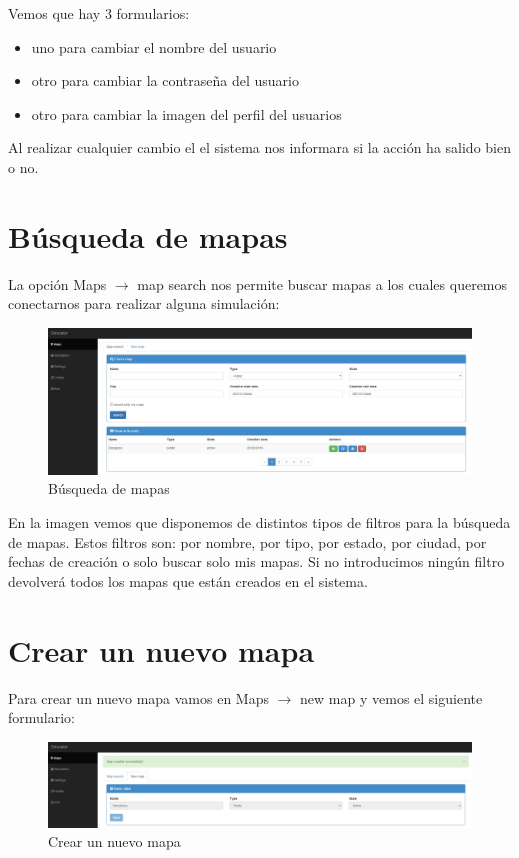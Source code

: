 Vemos que hay 3 formularios:

\begin{itemize}
	\item uno para cambiar el nombre del usuario
	\item otro para cambiar la contraseña del usuario
	\item otro para cambiar la imagen del perfil del usuarios
\end{itemize}

Al realizar cualquier cambio el el sistema nos informara si la acción ha salido bien o no.

\section{Búsqueda de mapas}\label{sec:BuscarMapas}

La opción Maps $\rightarrow$ map search nos permite buscar mapas a los cuales queremos conectarnos para realizar alguna simulación:

\begin{figure}[H]
	\centering\includegraphics[scale=0.25]{imagenes/capitulo7/busqueda-de-mapas.jpg}
	\caption{Búsqueda de mapas}
	\label{img:BuscarMapas}
\end{figure}

En la imagen vemos que disponemos de distintos tipos de filtros para la búsqueda de mapas. Estos filtros son: por nombre, por tipo, por estado, por ciudad, por fechas de creación o solo buscar solo mis mapas. Si no introducimos ningún filtro devolverá todos los mapas que están creados en el sistema.

\section{Crear un nuevo mapa}\label{sec:crearMapa}

Para crear un nuevo mapa vamos en Maps $\rightarrow$ new map y vemos el siguiente formulario:

\begin{figure}[H]
	\centering\includegraphics[scale=0.25]{imagenes/capitulo8/crear-un-nuevo-mapa.jpg}
	\caption{Crear un nuevo mapa}
	\label{img:AddMapa}
\end{figure}

